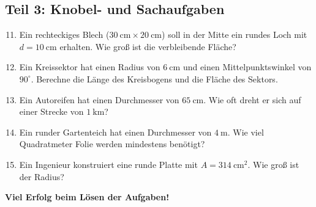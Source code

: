 \subsection*{Teil 3: Knobel- und Sachaufgaben}
\begin{enumerate}
    \setcounter{enumi}{10}
    \item Ein rechteckiges Blech ($30~\text{cm} \times 20~\text{cm}$) soll in der Mitte ein rundes Loch mit $d = 10~\text{cm}$ erhalten. Wie groß ist die verbleibende Fläche?
    \item Ein Kreissektor hat einen Radius von $6~\text{cm}$ und einen Mittelpunktswinkel von $90^\circ$. Berechne die Länge des Kreisbogens und die Fläche des Sektors.
    \item Ein Autoreifen hat einen Durchmesser von $65~\text{cm}$. Wie oft dreht er sich auf einer Strecke von $1~\text{km}$?
    \item Ein runder Gartenteich hat einen Durchmesser von $4~\text{m}$. Wie viel Quadratmeter Folie werden mindestens benötigt?
    \item Ein Ingenieur konstruiert eine runde Platte mit $A = 314~\text{cm}^2$. Wie groß ist der Radius?
\end{enumerate}

\vspace{1cm}
\textbf{Viel Erfolg beim Lösen der Aufgaben!}

